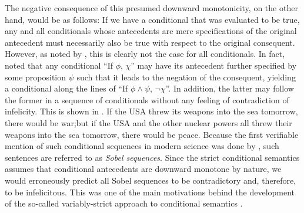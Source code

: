 The negative consequence of this presumed downward monotonicity, on the other hand, would be as follows: If we have a conditional that was evaluated to be true, any and all conditionals whose antecedents are mere specifications of the original antecedent must necessarily also be true with respect to the original consequent. However, as noted by \textcite[p.~10]{Lewis1973}, this is clearly not the case for all conditionals. In fact, \textcite{Lewis1973} noted that any conditional \enquote{If $\phi$, $\chi$} may have its antecedent further specified by some proposition $\psi$ such that it leads to the negation of the consequent, yielding a conditional along the lines of \enquote{If $\phi\land\psi$, $\neg\chi$}. In addition, the latter may follow the former in a sequence of conditionals without any feeling of contradiction of infelicity. This is shown in .
\ex{}If the USA threw its weapons into the sea tomorrow, there would be war;\linebreak but if the USA and the other nuclear powers all threw their weapons into the sea tomorrow, there would be peace.\hfill\parencite[p.~10]{Lewis1973}
\xe
Because the first verifiable mention of such conditional sequences in modern science was done by \textcite{Sobel1970}, such sentences are referred to as \textit{Sobel sequences}.
\ex{}\xe
Since the strict conditional semantics assumes that conditional antecedents are downward monotone by nature, we would erroneously predict all Sobel sequences to be contradictory and, therefore, to be infelicitous. This was one of the main motivations behind the development of the so-called variably-strict approach to conditional semantics \parencite{Stalnaker1968,Lewis1973}.


